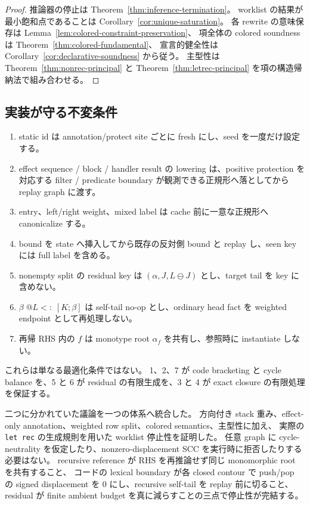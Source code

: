 \documentclass[uplatex,dvipdfmx,a4paper,10.5pt]{jsarticle}
\makeatletter
\theoremstyle{jpplain}
\newcommand{\row}[2]{[#1;#2]}
\newcommand{\lsub}[3]{#1\;@#2\mathrel{<:}\;#3}
\makeatother
\begin{document}
\begin{proof}
推論器の停止は Theorem~\ref{thm:inference-termination}。
worklist の結果が最小飽和点であることは Corollary~\ref{cor:unique-saturation}。
各 rewrite の意味保存は Lemma~\ref{lem:colored-constraint-preservation}、
項全体の colored soundness は Theorem~\ref{thm:colored-fundamental}、
宣言的健全性は Corollary~\ref{cor:declarative-soundness} から従う。
主型性は Theorem~\ref{thm:nonrec-principal} と Theorem~\ref{thm:letrec-principal} を項の構造帰納法で組み合わせる。
\end{proof}

\subsection*{実装が守る不変条件}

\begin{enumerate}
  \item static id は annotation/protect site ごとに fresh にし、seed を一度だけ設定する。
  \item effect sequence / block / handler result の lowering は、positive protection を対応する filter / predicate boundary が観測できる正規形へ落としてから replay graph に渡す。
  \item entry、left/right weight、mixed label は cache 前に一意な正規形へ canonicalize する。
  \item bound を state へ挿入してから既存の反対側 bound と replay し、seen key には full label を含める。
  \item nonempty split の residual key は $(\alpha,J,L\ominus J)$ とし、target tail を key に含めない。
  \item $\lsub{\beta}{L}{\row{K}{\beta}}$ は self-tail no-op とし、ordinary head fact を weighted endpoint として再処理しない。
  \item 再帰 RHS 内の $f$ は monotype root $\alpha_f$ を共有し、参照時に instantiate しない。
\end{enumerate}

これらは単なる最適化条件ではない。
1、2、7 が code bracketing と cycle balance を、5 と 6 が residual の有限生成を、3 と 4 が exact closure の有限処理を保証する。

\begin{statusbox}[title={本稿の到達点}]
二つに分かれていた議論を一つの体系へ統合した。
方向付き stack 重み、effect-only annotation、weighted row split、colored semantics、主型性に加え、
実際の \texttt{let rec} の生成規則を用いた worklist 停止性を証明した。
任意 graph に cycle-neutrality を仮定したり、nonzero-displacement SCC を実行時に拒否したりする必要はない。
recursive reference が RHS を再推論せず同じ monomorphic root を共有すること、
コードの lexical boundary が各 closed contour で push/pop の signed displacement を 0 にし、recursive self-tail を replay 前に切ること、
residual が finite ambient budget を真に減らすことの三点で停止性が完結する。
\end{statusbox}
\end{document}
